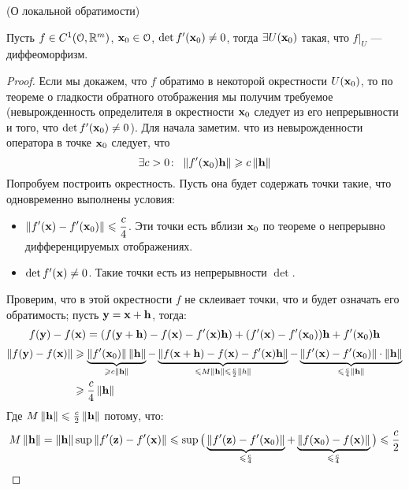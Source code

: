 \begin{theorem}(О локальной обратимости)

    Пусть $f \in C^1(\mathcal{O}, \mathbb{R}^m)$, $\mathbf{x}_0 \in \mathcal{O}$, $\det{f'(\mathbf{x}_0)} \neq 0$,
    тогда $\exists U(\mathbf{x}_0)$ такая, что $f\big|_U$ --- диффеоморфизм.
\end{theorem}
\begin{proof}
    Если мы докажем, что $f$ обратимо в некоторой окрестности $U(\mathbf{x}_0)$,
    то по теореме о гладкости обратного отображения мы получим требуемое
    (невырожденность определителя в окрестности $\mathbf{x}_0$ следует из его непрерывности
    и того, что $\det{f'(\mathbf{x}_0)} \neq 0$). Для начала заметим. что из невырожденности
    оператора в точке $\mathbf{x}_0$ следует, что
\[
    \exists c > 0\colon~ \left\lVert f'(\mathbf{x}_0)\mathbf{h}\right\rVert \geqslant c \left\lVert\mathbf{h}\right\rVert
\]
    Попробуем построить окрестность. Пусть она будет содержать точки такие, что
    одновременно выполнены условия:
    \begin{itemize}
        \item $\displaystyle \left\lVert f'(\mathbf{x}) - f'(\mathbf{x}_0)\right\rVert \leqslant \frac{c}{4}$.
            Эти точки есть вблизи $\mathbf{x}_0$ по теореме о непрерывно дифференцируемых
            отображениях.
        \item $\det{f'(\mathbf{x})} \neq 0$.
            Такие точки есть из непрерывности $\det$.
    \end{itemize}
    Проверим, что в этой окрестности $f$ не склеивает точки, что и будет означать
    его обратимость; пусть $\mathbf{y} = \mathbf{x} + \mathbf{h}$, тогда:
\[
    f(\mathbf{y}) - f(\mathbf{x}) = (f(\mathbf{y} + \mathbf{h}) - f(\mathbf{x}) - f'(\mathbf{x})\mathbf{h}) + (f'(\mathbf{x}) - f'(\mathbf{x}_0))\mathbf{h}
    + f'(\mathbf{x}_0)\mathbf{h}
\]
\begin{align*}
    \left\lVert f(\mathbf{y}) - f(\mathbf{x})\right\rVert &\geqslant \underbrace{\left\lVert f'(\mathbf{x}_0)\right\rVert \left\lVert\mathbf{h}\right\rVert}
    _{\geqslant c \left\lVert\mathbf{h}\right\rVert} -
    \underbrace{\left\lVert f(\mathbf{x} + \mathbf{h}) - f(\mathbf{x}) - f'(\mathbf{x})\mathbf{h}\right\rVert}_{\leqslant M \left\lVert\mathbf{h}\right\rVert
    \leqslant \frac{c}{2} \left\lVert h\right\rVert}
    - \underbrace{\left\lVert f'(\mathbf{x}) - f'(\mathbf{x}_0)\right\rVert \cdot \left\lVert\mathbf{h}\right\rVert}_{\leqslant \frac{c}{4}
    \left\lVert\mathbf{h}\right\rVert} \\
    &\geqslant \frac{c}{4} \left\lVert\mathbf{h}\right\rVert
\end{align*}
    Где $M \left\lVert\mathbf{h}\right\rVert \leqslant \frac{c}{2} \left\lVert\mathbf{h}\right\rVert$ потому, что:
\[
    M \left\lVert\mathbf{h}\right\rVert = \left\lVert\mathbf{h}\right\rVert \sup{\left\lVert f'(\mathbf{z}) - f'(\mathbf{x})\right\rVert} \leqslant
    \sup{\big(\underbrace{\left\lVert f'(\mathbf{z}) - f'(\mathbf{x}_0)\right\rVert}_{\leqslant \frac{c}{4}} + \underbrace{\left\lVert f(\mathbf{x}_0) - f(\mathbf{x})\right\rVert}_{\leqslant \frac{c}{4}}\big)} \leqslant
    \frac{c}{2}
\]
\end{proof}

